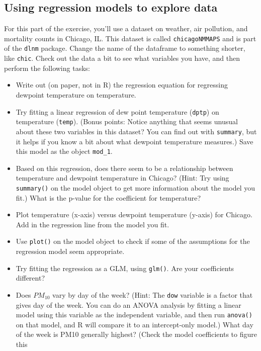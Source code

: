 \documentclass[]{book}
\providecommand{\tightlist}{%
  \setlength{\itemsep}{0pt}\setlength{\parskip}{0pt}}
\theoremstyle{definition}
\theoremstyle{definition}
\theoremstyle{definition}
\theoremstyle{remark}
\begin{document}
\subsection{Using regression models to explore
data}\label{using-regression-models-to-explore-data}

For this part of the exercise, you'll use a dataset on weather, air
pollution, and mortality counts in Chicago, IL. This dataset is called
\texttt{chicagoNMMAPS} and is part of the \texttt{dlnm} package. Change
the name of the dataframe to something shorter, like \texttt{chic}.
Check out the data a bit to see what variables you have, and then
perform the following tasks:

\begin{itemize}
\tightlist
\item
  Write out (on paper, not in R) the regression equation for regressing
  dewpoint temperature on temperature.
\item
  Try fitting a linear regression of dew point temperature
  (\texttt{dptp}) on temperature (\texttt{temp}). (Bonus points: Notice
  anything that seems unusual about these two variables in this dataset?
  You can find out with \texttt{summary}, but it helps if you know a bit
  about what dewpoint temperature measures.) Save this model as the
  object \texttt{mod\_1}.
\item
  Based on this regression, does there seem to be a relationship between
  temperature and dewpoint temperature in Chicago? (Hint: Try using
  \texttt{summary()} on the model object to get more information about
  the model you fit.) What is the p-value for the coefficient for
  temperature?
\item
  Plot temperature (x-axis) versus dewpoint temperature (y-axis) for
  Chicago. Add in the regression line from the model you fit.
\item
  Use \texttt{plot()} on the model object to check if some of the
  assumptions for the regression model seem appropriate.
\item
  Try fitting the regression as a GLM, using \texttt{glm()}. Are your
  coefficients different?
\item
  Does \(PM_{10}\) vary by day of the week? (Hint: The \texttt{dow}
  variable is a factor that gives day of the week. You can do an ANOVA
  analysis by fitting a linear model using this variable as the
  independent variable, and then run \texttt{anova()} on that model, and
  R will compare it to an intercept-only model.) What day of the week is
  PM10 generally highest? (Check the model coefficients to figure this

\end{itemize}
\end{document}
